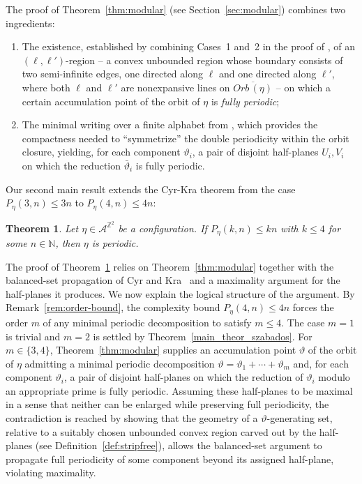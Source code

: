 \documentclass[12pt]{amsart}
\numberwithin{equation}{section}
\newtheorem{theorem}{Theorem}[section]
\begin{document}
\noindent
The proof of Theorem~\ref{thm:modular} (see Section~\ref{sec:modular})
combines two ingredients:
\begin{enumerate}
     \item The existence, established by combining Cases~1 and~2 in the
      proof of \cite[Lemma~4.6]{Colle23}, of an $(\ell,\ell')$-region
       -- a convex unbounded region whose boundary
      consists of two semi-infinite edges, one directed along $\ell$ and
      one directed along $\ell'$, where both $\ell$ and $\ell'$ are
      nonexpansive lines on $\overline{Orb \, (\eta)}$ -- on which a certain accumulation
      point of the orbit of $\eta$ is \emph{fully periodic};
        \item The minimal writing over a finite alphabet from \cite{Colle22},
        which provides the compactness needed to ``symmetrize'' the
        double periodicity within the orbit closure, yielding, for
        each component $\vartheta_i$, a pair of disjoint half-planes
        $U_i, V_i$ on which the reduction $\bar\vartheta_i$ is fully
        periodic.
\end{enumerate}

Our second main result extends the Cyr-Kra theorem \cite{CyrKra16}
from the case $P_\eta(3,n)\le 3n$ to $P_\eta(4,n)\le 4n$:

\begin{theorem}
\label{thm:main}
Let $\eta\in\mathcal A^{\mathbb Z^2}$ be a configuration.  If $P_\eta(k,n)\le kn$ with $ k \le 4 $
for some $n\in\mathbb N$, then $\eta$ is periodic.
\end{theorem}

The proof of Theorem~\ref{thm:main} relies on Theorem~\ref{thm:modular} together with the balanced-set propagation of Cyr and Kra~\cite{CyrKra15} and a maximality argument for the half-planes it produces. We now explain the logical structure of the argument. By Remark~\ref{rem:order-bound}, the complexity bound $ P_\eta(4,n) \le 4n $ forces the order $m$ of any minimal periodic decomposition to satisfy $m \le 4$. The case $m=1$ is trivial and $m=2$ is settled by Theorem~\ref{main_theor_szabados}.
For $ m \in \{3, 4\} $, Theorem~\ref{thm:modular} supplies an accumulation point $\vartheta$ of the orbit of $\eta$ admitting a minimal periodic decomposition $ \vartheta = \vartheta_1 + \cdots + \vartheta_m $ and, for each component $ \vartheta_i $, a pair of disjoint half-planes on which the reduction of $ \vartheta_i $ modulo an appropriate prime is fully periodic. Assuming these half-planes to be maximal in a sense that neither can be enlarged while preserving full periodicity, the contradiction is reached by showing that the geometry of a $\vartheta$-generating set, relative to a suitably chosen unbounded convex region carved out by the half-planes (see Definition~\ref{def:stripfree}), allows the balanced-set argument to propagate full periodicity of some component beyond its assigned half-plane, violating maximality.
\end{document}
